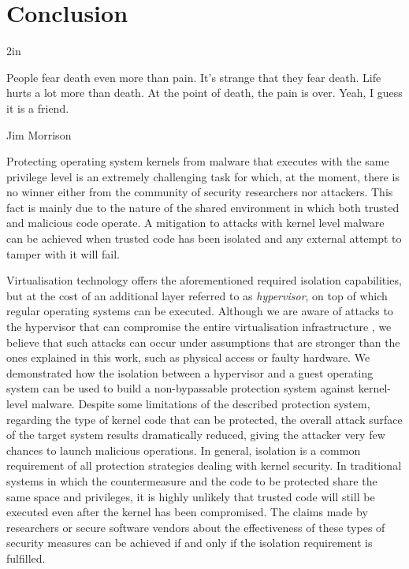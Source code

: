 \chapter{Conclusion} \label{conclusion}

\epigraph{2in}{People fear death even more than pain. It's strange that they fear death. Life hurts a lot more than death. At the point of death, the pain is over. Yeah, I guess it is a friend.}{Jim Morrison}{}





Protecting operating system kernels from malware that executes with the same privilege level is an extremely challenging task for which, at the moment, there is no winner either from the community of security researchers nor attackers. This fact is mainly due to the nature of the shared environment in which both trusted and malicious code operate.
A mitigation to attacks with kernel level malware can be achieved when trusted code has been isolated and any external attempt to tamper with it will fail. 

Virtualisation technology offers the aforementioned required isolation capabilities, but at the cost of an additional layer referred to as \emph{hypervisor}, on top of which regular operating systems can be executed. Although we are aware of attacks to the hypervisor that can compromise the entire virtualisation infrastructure \cite{hyperattack, Desnos:2011:DHR:1938158.1938205,Embleton:2008:SRN:1460877.1460892, Gebhardt:2008:HPH:2303959.2304226}, we believe that such attacks can occur under assumptions that are stronger than the ones explained in this work, such as physical access or faulty hardware. We demonstrated how the isolation between a hypervisor and a guest operating system can be used to build a non-bypassable protection system against kernel-level malware. Despite some limitations of the described protection system, regarding the type of kernel code that can be protected, the overall attack surface of the target system results dramatically reduced, giving the attacker very few chances to launch malicious operations. 
In general, isolation is a common requirement of all protection strategies dealing with kernel security. 
In traditional systems in which the countermeasure and the code to be protected share the same space and privileges, it is highly unlikely that trusted code will still be executed even after the kernel has been compromised. The claims made by researchers or secure software vendors about the effectiveness of these types of security measures can be achieved if and only if the isolation requirement is fulfilled.
 
